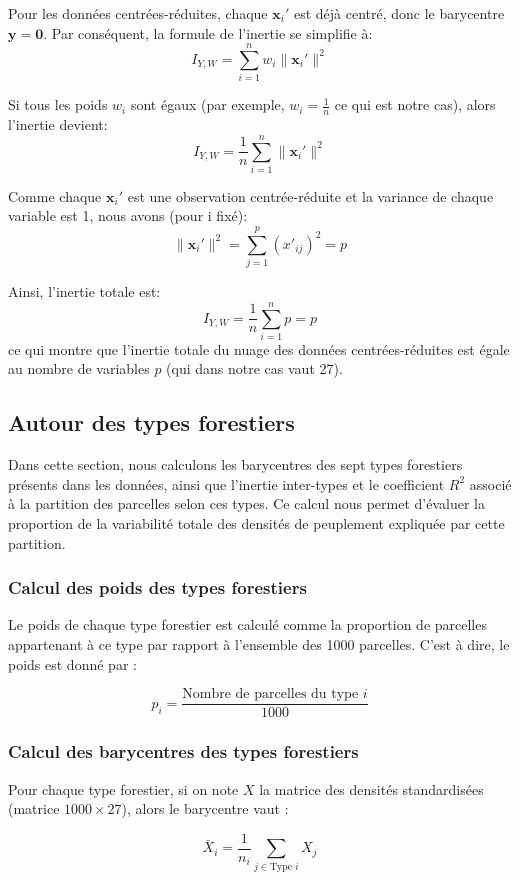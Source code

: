 \documentclass{article}
\begin{document}
Pour les données centrées-réduites, chaque $\mathbf{x}_i'$ est déjà centré, donc le barycentre $\mathbf{y} = \mathbf{0}$. Par conséquent, la formule de l'inertie se simplifie à:
\[
I_{Y, W} = \sum_{i=1}^n w_i \|\mathbf{x}_i'\|^2
\]

Si tous les poids $w_i$ sont égaux (par exemple, $w_i = \frac{1}{n}$ ce qui est notre cas), alors l'inertie devient:
\[
I_{Y, W} = \frac{1}{n} \sum_{i=1}^n \|\mathbf{x}_i'\|^2
\]

Comme chaque $\mathbf{x}_i'$ est une observation centrée-réduite et la variance de chaque variable est 1, nous avons (pour i fixé):
\[
\|\mathbf{x}_i'\|^2 = \sum_{j=1}^p (x'_{ij})^2 = p
\]

Ainsi, l'inertie totale est:
\[
I_{Y, W} = \frac{1}{n} \sum_{i=1}^n p = p 
\]
ce qui montre que l'inertie totale du nuage des données centrées-réduites est égale au nombre de variables $p$ (qui dans notre cas vaut 27).

\subsection{Autour des types forestiers}

Dans cette section, nous calculons les barycentres des sept types forestiers présents dans les données, ainsi que l'inertie inter-types et le coefficient $R^2$ associé à la partition des parcelles selon ces types. Ce calcul nous permet d'évaluer la proportion de la variabilité totale des densités de peuplement expliquée par cette partition.

\subsubsection{Calcul des poids des types forestiers}
Le poids de chaque type forestier est calculé comme la proportion de parcelles appartenant à ce type par rapport à l'ensemble des 1000 parcelles. C'est à dire, le poids est donné par :

\[
p_i = \frac{\text{Nombre de parcelles du type } i}{1000}
\]


\subsubsection{Calcul des barycentres des types forestiers}
Pour chaque type forestier, si on note $X$ la matrice des densités standardisées (matrice $1000 \times 27$), alors le barycentre vaut :

\[
\bar{X}_i = \frac{1}{n_i} \sum_{j \in \text{Type } i} X_j
\]
\end{document}
